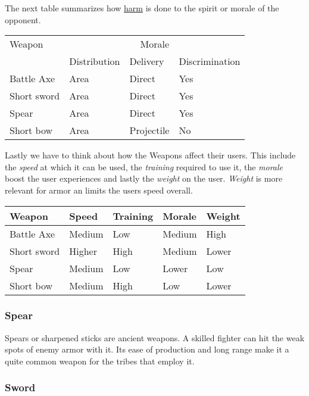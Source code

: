 The next table summarizes how \hyperref[ch:Conflict:Combat]{harm} is done to
the spirit or morale of the opponent.

\begin{longtable}{llll}
	\toprule
	Weapon
	 & \multicolumn{3}{c}{Morale}                               \\
	 & Distribution               & Delivery   & Discrimination \\
	\midrule
	Battle Axe
	 & Area                       & Direct     & Yes            \\
	Short sword
	 & Area                       & Direct     & Yes            \\
	Spear
	 & Area                       & Direct     & Yes            \\
	Short bow
	 & Area                       & Projectile & No             \\
	\bottomrule
\end{longtable}

Lastly we have to think about how the \glspl{Weapon} affect their users. This
include the \emph{speed} at which it can be used, the \emph{training} required
to use it, the \emph{morale} boost the user experiences and lastly the
\emph{weight} on the user. \emph{Weight} is more relevant for armor an limits
the users speed overall.

\begin{longtable}{lllll}
	\toprule
	Weapon
	 & Speed  & Training
	 & Morale & Weight   \\
	\midrule
	Battle Axe
	 & Medium & Low
	 & Medium & High     \\
	Short sword
	 & Higher & High
	 & Medium & Lower    \\
	Spear
	 & Medium & Low
	 & Lower  & Low      \\
	Short bow
	 & Medium & High
	 & Low    & Lower    \\
	\bottomrule
\end{longtable}

\subsubsection{Spear}\label{ch:Goods:Armory:Weapons:Spear}

Spears or sharpened sticks are ancient weapons. A skilled fighter can hit the
weak spots of enemy armor with it. Its ease of production and long range make
it a quite common weapon for the tribes that employ it.

\subsubsection{Sword}\label{ch:Goods:Armory:Weapons:Sword}

